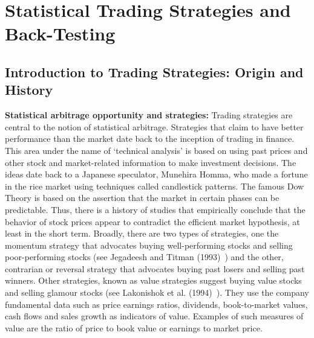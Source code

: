 \chapter{Statistical Trading Strategies and Back-Testing\label{ch:stat_ts}}
\section{Introduction to Trading Strategies: Origin and History\label{sec:intro_trade_strateg}}

\noindent\textbf{Statistical arbitrage opportunity and strategies:} Trading strategies are central to the notion of statistical arbitrage. Strategies that claim to have better performance than the market date back to the inception of trading in finance. This area under the name of `technical analysis' is based on using past prices and other stock and market-related information to make investment decisions. The ideas date back to a Japanese speculator, Munehira Homma, who made a fortune in the rice market using techniques called candlestick patterns. The famous Dow Theory is based on the assertion that the market in certain phases can be predictable. Thus, there is a history of studies that empirically conclude that the behavior of stock prices appear to contradict the efficient market hypothesis, at least in the short term. Broadly, there are two types of strategies, one the momentum strategy that advocates buying well-performing stocks and selling poor-performing stocks (see Jegadeesh and Titman (1993)~\cite{JeTit}) and the other, contrarian or reversal strategy that advocates buying past losers and selling past winners. Other strategies, known as value strategies suggest buying value stocks and selling glamour stocks (see Lakonishok et al. (1994)~\cite{Lako}). They use the company fundamental data such as price earnings ratios, dividends, book-to-market values, cash flows and sales growth as indicators of value. Examples of such measures of value are the ratio of price to book value or earnings to market price.


